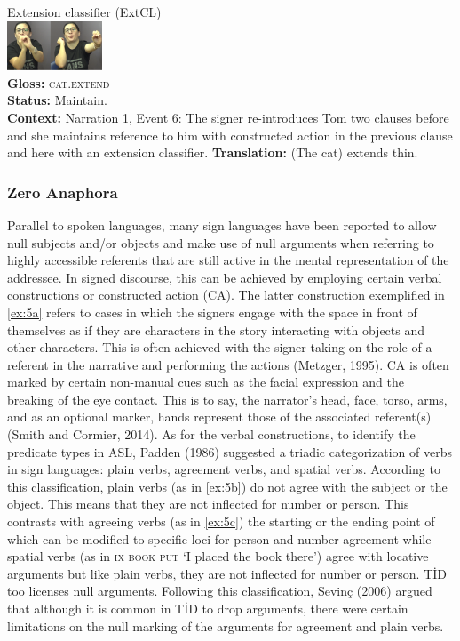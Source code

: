 \documentclass[]{elsarticle} %
\begin{document}
\begin{exe}
\begin{xlist}
\ex \label{ex:4d} Extension classifier (ExtCL) \\\glll
{} \includegraphics[width=80pt]{pictures/p9.png} \\ \textbf{Gloss:} \textsc{cat.extend} \\ 
\textbf{Status:} Maintain. \\
\glt \textbf{Context:} Narration 1, Event 6: The signer re-introduces Tom two clauses before and she maintains reference to him with constructed action in the previous clause and here with an extension classifier.
\glt \textbf{Translation:} (The cat) extends thin.
\end{xlist}
\end{exe}

\hypertarget{zero-anaphora}{%
\subsubsection{Zero Anaphora}\label{zero-anaphora}}

Parallel to spoken languages, many sign languages have been reported to
allow null subjects and/or objects and make use of null arguments when
referring to highly accessible referents that are still active in the
mental representation of the addressee. In signed discourse, this can be
achieved by employing certain verbal constructions or constructed action
(CA). The latter construction exemplified in \ref{ex:5a} refers to cases
in which the signers engage with the space in front of themselves as if
they are characters in the story interacting with objects and other
characters. This is often achieved with the signer taking on the role of
a referent in the narrative and performing the actions (Metzger, 1995).
CA is often marked by certain non-manual cues such as the facial
expression and the breaking of the eye contact. This is to say, the
narrator's head, face, torso, arms, and as an optional marker, hands
represent those of the associated referent(s) (Smith and Cormier, 2014).
As for the verbal constructions, to identify the predicate types in ASL,
Padden (1986) suggested a triadic categorization of verbs in sign
languages: plain verbs, agreement verbs, and spatial verbs. According to
this classification, plain verbs (as in \ref{ex:5b}) do not agree with
the subject or the object. This means that they are not inflected for
number or person. This contrasts with agreeing verbs (as in \ref{ex:5c})
the starting or the ending point of which can be modified to specific
loci for person and number agreement while spatial verbs (as in
\textsc{ix book put} `I placed the book there') agree with locative
arguments but like plain verbs, they are not inflected for number or
person. TİD too licenses null arguments. Following this classification,
Sevinç (2006) argued that although it is common in TİD to drop
arguments, there were certain limitations on the null marking of the
arguments for agreement and plain verbs.
\end{document}

